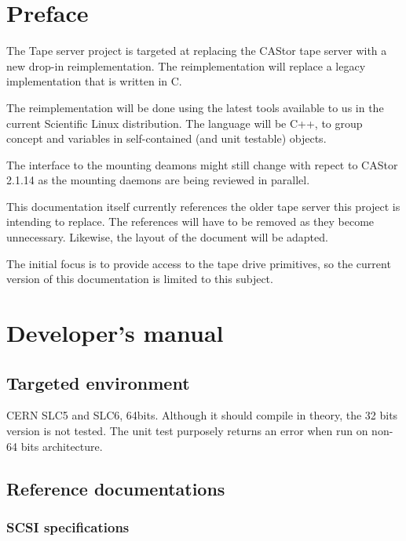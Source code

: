\chapter*{Preface}

The Tape server project is targeted at replacing the CAStor tape server with a new drop-{}in reimplementation. The reimplementation will replace a legacy implementation that is written in C.

The reimplementation will be done using the latest tools available to us in the current Scientific Linux distribution. The language will be C++, to group concept and variables in self-contained
(and unit testable) objects.

The interface to the mounting deamons might still change with repect to CAStor 2.1.14 as the mounting daemons are being reviewed in parallel.

This documentation itself currently references the older tape server this project is intending to replace. The references will have to be removed as they become unnecessary. 
Likewise, the layout of the document will be adapted.

The initial focus is to provide access to the tape drive primitives, so the current version of this documentation is limited to this subject.


\chapter{Developer's manual}

\section{Targeted environment}

CERN SLC5 and SLC6, 64bits. Although it should compile in theory, the 32 bits version is not tested. The unit test purposely returns an error when run on non-64 bits architecture.

\section{Reference documentations}
\subsection{SCSI specifications}

